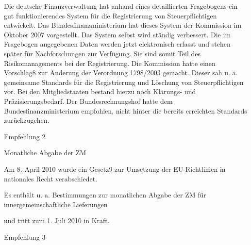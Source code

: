 \documentclass[10pt]{article}
\begin{document}
Die deutsche Finanzverwaltung hat anhand eines detaillierten Fragebogens ein gut funktionierendes System für die Registrierung von Steuerpflichtigen entwickelt.
Das Bundesfinanzministerium hat dieses System der Kommission im Oktober 2007 vorgestellt.
Das System selbst wird ständig verbessert.
Die im Fragebogen angegebenen Daten werden jetzt elektronisch erfasst und stehen später für Nachforschungen zur Verfügung. Sie sind somit Teil des Risikomanagements bei der Registrierung.
Die Kommission hatte einen Vorschlag8 zur Änderung der Verordnung 1798/2003 gemacht. Dieser sah u. a. gemeinsame Standards für die Registrierung und Löschung von Steuerpflichtigen vor.
Bei den Mitgliedstaaten bestand hierzu noch Klärungs- und Präzisierungsbedarf.
Der Bundesrechnungshof hatte dem Bundesfinanzministerium empfohlen, nicht hinter die bereits erreichten Standards zurückzugehen.


Empfehlung 2



Monatliche Abgabe der ZM

Am 8. April 2010 wurde ein Gesetz9 zur Umsetzung der EU-Richtlinien in nationales Recht verabschiedet.


Es enthält u. a. Bestimmungen zur monatlichen Abgabe der ZM für innergemeinschaftliche Lieferungen

und tritt zum 1. Juli 2010 in Kraft.


Empfehlung 3
\end{document}
